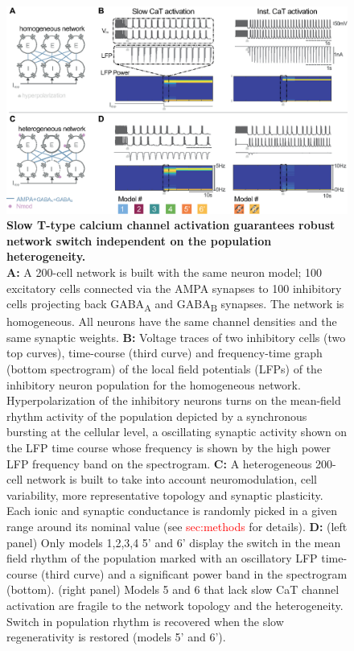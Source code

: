 \begin{figure}[h!]
\includegraphics[scale=0.95]{fig/Plos/Fig4}
\caption{ {\bf Slow T-type calcium channel activation guarantees robust network switch independent on the population heterogeneity.}\\ \textbf{A:} A 200-cell network is built with the same neuron model; 100 excitatory cells connected via the AMPA synapses to 100 inhibitory cells projecting back GABA\textsubscript{A} and GABA\textsubscript{B} synapses. The network is homogeneous. All neurons have the same channel densities and the same synaptic weights. \textbf{B:} Voltage traces of two inhibitory cells (two top curves), time-course (third curve) and frequency-time graph (bottom spectrogram) of the local field potentials (LFPs) of the inhibitory neuron population for the homogeneous network. Hyperpolarization of the inhibitory neurons turns on the mean-field rhythm activity of the population depicted by a synchronous bursting at the cellular level, a oscillating synaptic activity shown on the LFP time course whose frequency is shown by the high power LFP frequency band on the spectrogram. \textbf{C:}  A heterogeneous 200-cell network is built to take into account neuromodulation, cell variability, more representative topology and synaptic plasticity. Each ionic and synaptic conductance is randomly picked in a given range around its nominal value (see \textcolor{red}{sec:methods} for details).   \textbf{D:} (left panel) Only models 1,2,3,4 5' and 6' display the switch in the mean field rhythm of the population marked with an oscillatory LFP time-course (third curve) and a significant power band in the spectrogram (bottom). (right panel) Models 5 and 6 that lack slow CaT channel activation are fragile to the network topology and the heterogeneity. Switch in population rhythm is recovered when the slow regenerativity is restored (models 5' and 6').} 
\label{fig:4}
\end{figure}

